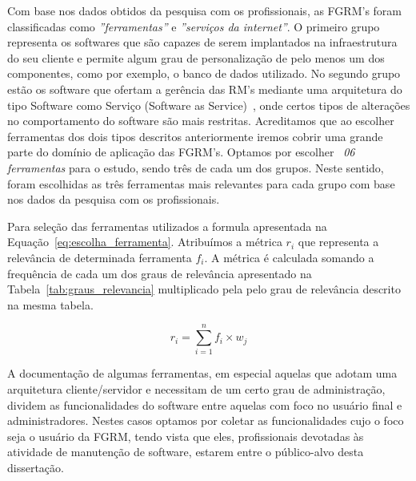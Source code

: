 Com base nos dados obtidos da pesquisa com os profissionais, as FGRM's foram
classificadas como \textit{''ferramentas''} e \textit{''serviços da internet''}.
O primeiro grupo representa os softwares que são capazes de serem implantados na
infraestrutura do seu cliente e permite algum grau de personalização de pelo
menos um dos componentes, como por exemplo, o banco de dados utilizado. No
segundo grupo estão os software que ofertam a gerência das RM's mediante uma
arquitetura do tipo Software como Serviço (Software as
Service)~\cite{fox2013engineering}, onde certos tipos de alterações no
comportamento do software são mais restritas. Acreditamos que ao escolher
ferramentas dos dois tipos descritos anteriormente iremos cobrir uma grande
parte do domínio de aplicação das FGRM's. Optamos por escolher ~\textit{06
	ferramentas} para o estudo, sendo três de cada um dos grupos. Neste sentido,
foram escolhidas as três ferramentas mais relevantes para cada grupo com base
nos dados da pesquisa com os profissionais.

Para seleção das ferramentas utilizados a formula apresentada na
Equação~\ref{eq:escolha_ferramenta}.  Atribuímos a métrica $r_i$ que representa
a relevância de determinada ferramenta $f_i$. A métrica é calculada somando a
frequência de cada um dos graus de relevância apresentado na
Tabela~\ref{tab:graus_relevancia} multiplicado pela pelo grau de relevância
descrito na mesma tabela.

\begin{equation}
\label{eq:escolha_ferramenta}
r_i = \sum_{i=1}^{n} f_i \times w_j
\end{equation}

A documentação de algumas ferramentas, em especial aquelas que adotam uma
arquitetura cliente/servidor e necessitam de um certo grau de administração,
dividem as funcionalidades do software entre aquelas com foco no usuário final e
administradores. Nestes casos optamos por coletar as funcionalidades cujo o foco
seja o usuário da FGRM, tendo vista que eles, profissionais devotadas às
atividade de manutenção de software, estarem entre o público-alvo desta
dissertação.

\begin{table}[htb]
\centering
\caption{Graus de Relevância}
\label{tab:graus_relevancia}
\end{table}



